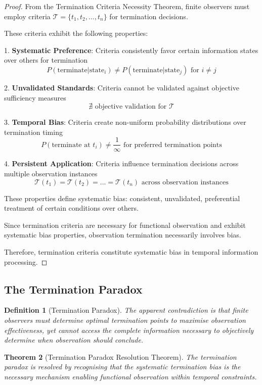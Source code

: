 \documentclass[12pt,a4paper]{article}
\newtheorem{theorem}{Theorem}[section]
\newtheorem{definition}[theorem]{Definition}
\begin{document}
\begin{proof}
From the Termination Criteria Necessity Theorem, finite observers must employ criteria $\mathcal{T} = \{t_1, t_2, ..., t_n\}$ for termination decisions.

These criteria exhibit the following properties:

1. \textbf{Systematic Preference}: Criteria consistently favor certain information states over others for termination
   $$P(\text{terminate}|\text{state}_i) \neq P(\text{terminate}|\text{state}_j) \text{ for } i \neq j$$

2. \textbf{Unvalidated Standards}: Criteria cannot be validated against objective sufficiency measures
   $$\nexists \text{ objective validation for } \mathcal{T}$$

3. \textbf{Temporal Bias}: Criteria create non-uniform probability distributions over termination timing
   $$P(\text{terminate at } t_i) \neq \frac{1}{\infty} \text{ for preferred termination points}$$

4. \textbf{Persistent Application}: Criteria influence termination decisions across multiple observation instances
   $$\mathcal{T}(t_1) = \mathcal{T}(t_2) = ... = \mathcal{T}(t_n) \text{ across observation instances}$$

These properties define systematic bias: consistent, unvalidated, preferential treatment of certain conditions over others.

Since termination criteria are necessary for functional observation and exhibit systematic bias properties, observation termination necessarily involves bias.

Therefore, termination criteria constitute systematic bias in temporal information processing.
\end{proof}

\subsection{The Termination Paradox}

\begin{definition}[Termination Paradox]
The apparent contradiction is that finite observers must determine optimal termination points to maximise observation effectiveness, yet cannot access the complete information necessary to objectively determine when observation should conclude.
\end{definition}

\begin{theorem}[Termination Paradox Resolution Theorem]
The termination paradox is resolved by recognising that the systematic termination bias is the necessary mechanism enabling functional observation within temporal constraints.
\end{theorem}
\end{document}
